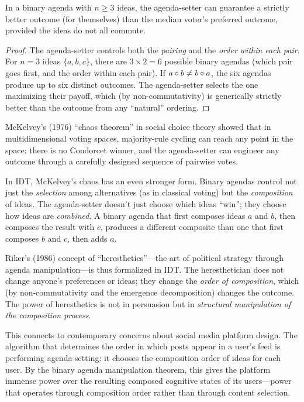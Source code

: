 \begin{theorem}
\label{thm:binary-manipulation}
In a binary agenda with $n \geq 3$ ideas, the agenda-setter can guarantee
a strictly better outcome (for themselves) than the median voter's preferred
outcome, provided the ideas do not all commute.
\end{theorem}

\begin{proof}
The agenda-setter controls both the \emph{pairing} and the \emph{order within
each pair}.  For $n = 3$ ideas $\{a, b, c\}$, there are $3 \times 2 = 6$
possible binary agendas (which pair goes first, and the order within
each pair).  If $a \circ b \neq b \circ a$, the six agendas produce
up to six distinct outcomes.  The agenda-setter selects the one maximizing
their payoff, which (by non-commutativity) is generically strictly better
than the outcome from any ``natural'' ordering.
\end{proof}

\begin{interpretation}
\label{interp:mckelvey}
McKelvey's (1976) ``chaos theorem'' in social choice theory showed that in
multidimensional voting spaces, majority-rule cycling can reach any point
in the space: there is no Condorcet winner, and the agenda-setter can
engineer any outcome through a carefully designed sequence of pairwise votes.

In IDT, McKelvey's chaos has an even stronger form.  Binary agendas control
not just the \emph{selection} among alternatives (as in classical voting)
but the \emph{composition} of ideas.  The agenda-setter doesn't just choose
which ideas ``win''; they choose how ideas are \emph{combined}.  A binary
agenda that first composes ideas $a$ and $b$, then composes the result with
$c$, produces a different composite than one that first composes $b$ and $c$,
then adds $a$.

Riker's (1986) concept of ``heresthetics''---the art of political strategy
through agenda manipulation---is thus formalized in IDT.  The heresthetician
does not change anyone's preferences or ideas; they change the \emph{order of
composition}, which (by non-commutativity and the emergence decomposition)
changes the outcome.  The power of heresthetics is not in persuasion but in
\emph{structural manipulation of the composition process}.

This connects to contemporary concerns about social media platform design.
The algorithm that determines the order in which posts appear in a user's
feed is performing agenda-setting: it chooses the composition order of ideas
for each user.  By the binary agenda manipulation theorem, this gives the
platform immense power over the resulting composed cognitive states of its
users---power that operates through composition order rather than through
content selection.
\end{interpretation}


